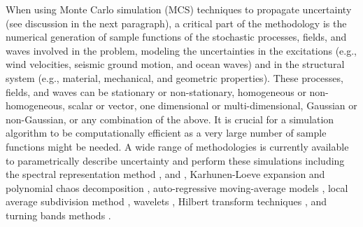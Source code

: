 When using Monte Carlo simulation (MCS) techniques to propagate uncertainty (see discussion in the next paragraph), a critical part of the methodology is the numerical generation of sample functions of the stochastic processes, fields, and waves involved in the problem, modeling the uncertainties in the excitations (e.g., wind velocities, seismic ground motion, and ocean waves) and in the structural system (e.g., material, mechanical, and geometric properties). These processes, fields, and waves can be stationary or non-stationary, homogeneous or non-homogeneous, scalar or vector, one dimensional or multi-dimensional, Gaussian or non-Gaussian, or any combination of the above. It is crucial for a simulation algorithm to be computationally efficient as a very large number of sample functions might be needed. A wide range of methodologies is currently available to parametrically describe uncertainty and perform these simulations including the spectral representation method \citep{li1991simulation, shinozuka1991simulation, shields2011simple}, and \citep{benowitz2015simulation}, Karhunen-Loeve expansion and polynomial chaos decomposition \citep{ghanem1991stochastic}, auto-regressive moving-average models \citep{spanos1983arma,deodatis1988autoregressive}, local average subdivision method \citep{fenton1990simulation}, wavelets \citep{zeldin1996random}, Hilbert transform techniques \citep{wang2014modeling}, and turning bands methods \citep{mantoglou1982turning}.

